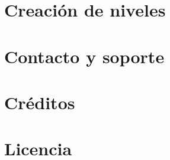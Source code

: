 \documentclass[titlepage]{article}
\begin{document}
\clearpage

\section{Creación de niveles}


\clearpage

\section{Contacto y soporte}


\clearpage
\section{Créditos}


\clearpage

\section{Licencia}

\end{document}
